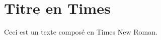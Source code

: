 \documentclass{scrartcl}
\begin{document}
\section{Titre en Times}
Ceci est un texte composé en Times New Roman.
\end{document}
